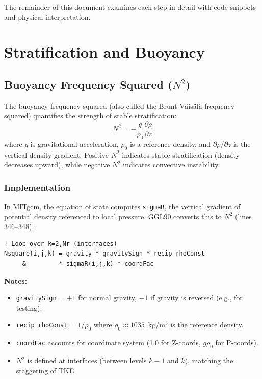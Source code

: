 \documentclass[12pt,letterpaper]{article}
\begin{document}
The remainder of this document examines each step in detail with code snippets
and physical interpretation.

\section{Stratification and Buoyancy}
\label{sec:stratification_buoyancy}

\subsection{Buoyancy Frequency Squared ($N^2$)}

The buoyancy frequency squared (also called the Brunt-V\"ais\"al\"a frequency
squared) quantifies the strength of stable stratification:
\[
N^2 = -\frac{g}{\rho_0} \frac{\partial \rho}{\partial z}
\]
where $g$ is gravitational acceleration, $\rho_0$ is a reference density, and
$\partial \rho / \partial z$ is the vertical density gradient. Positive $N^2$
indicates stable stratification (density decreases upward), while negative
$N^2$ indicates convective instability.

\subsubsection{Implementation}

In MITgcm, the equation of state computes \texttt{sigmaR}, the vertical
gradient of potential density referenced to local pressure. GGL90 converts
this to $N^2$ (lines 346--348):

\begin{lstlisting}[caption={\texttt{ggl90\_calc.F}, lines 346--348 -- Buoyancy frequency squared.}]
! Loop over k=2,Nr (interfaces)
Nsquare(i,j,k) = gravity * gravitySign * recip_rhoConst
     &         * sigmaR(i,j,k) * coordFac
\end{lstlisting}

\textbf{Notes:}
\begin{itemize}[leftmargin=*]
  \item \texttt{gravitySign} = $+1$ for normal gravity, $-1$ if gravity is
        reversed (e.g., for testing).
  \item \texttt{recip\_rhoConst} = $1/\rho_0$ where $\rho_0 \approx 1035$~kg/m$^3$
        is the reference density.
  \item \texttt{coordFac} accounts for coordinate system (1.0 for Z-coords,
        $g\rho_0$ for P-coords).
  \item $N^2$ is defined at interfaces (between levels $k-1$ and $k$), matching
        the staggering of TKE.
\end{itemize}
\end{document}
